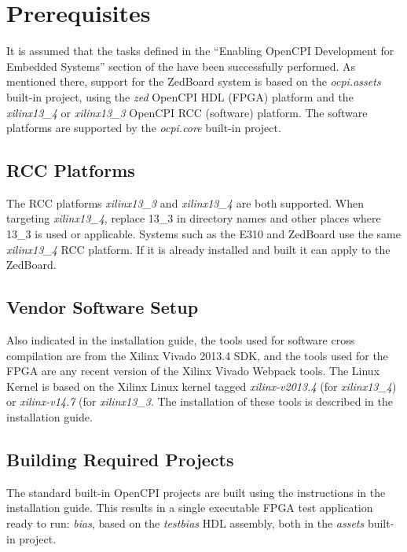 \section{Prerequisites}
\begin{flushleft}
It is assumed that the tasks defined in the ``Enabling OpenCPI Development for Embedded Systems'' section of the  have been successfully performed.
As mentioned there, support for the ZedBoard system is based on the \textit{ocpi.assets} built-in project, using the \textit{zed} OpenCPI HDL (FPGA) platform and the \textit{xilinx13\_4} or \textit{xilinx13\_3 }OpenCPI RCC (software) platform.  The software platforms are supported by the \textit{ocpi.core} built-in project.

\subsection{RCC Platforms}
The RCC platforms \textit{xilinx13\_3} and \textit{xilinx13\_4} are both supported. When targeting \textit{xilinx13\_4}, replace 13\_3 in directory names and other places where 13\_3 is used or applicable. Systems such as the E310 and ZedBoard use the same \textit{xilinx13\_4} RCC platform. If it is already installed and built it can apply to the ZedBoard. 

\subsection{Vendor Software Setup}
Also indicated in the installation guide, the tools used for software cross compilation are from the Xilinx Vivado 2013.4 SDK, and the tools used for the FPGA are any recent version of the Xilinx Vivado Webpack tools.  The Linux Kernel is based on the Xilinx Linux kernel tagged \textit{xilinx-v2013.4} (for \textit{xilinx13\_4}) or \textit{xilinx-v14.7} (for \textit{xilinx13\_3}.  The installation of these tools is described in the installation guide.

\subsection{Building Required Projects}
\label{sec:Building OpenCPI projects}
The standard built-in OpenCPI projects are built using the instructions in the installation guide.  This results in a single executable FPGA test application ready to run:  \textit{bias}, based on the \textit{testbias} HDL assembly, both in the \textit{assets} built-in project.


\end{flushleft}
